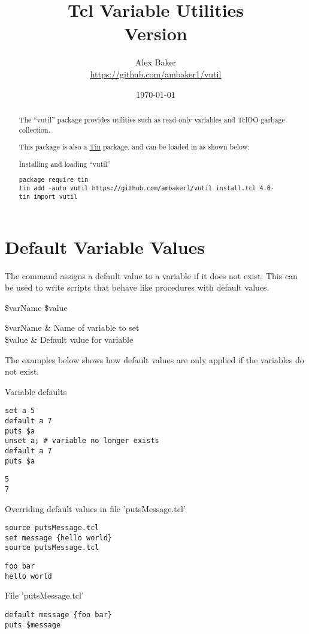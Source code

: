 \documentclass{article}
\title{\Huge Tcl Variable Utilities\\\small Version \version}
\author{Alex Baker\\\small\url{https://github.com/ambaker1/vutil}}
\date{\small\today}
\begin{document}
\maketitle
\begin{abstract}
\begin{center}
The ``vutil'' package provides utilities such as read-only variables and TclOO garbage collection.

This package is also a \textcolor{blue}{\href{https://github.com/ambaker1/Tin}{Tin}} package, and can be loaded in as shown below:
\end{center}
\begin{example}{Installing and loading ``vutil''}
\begin{lstlisting}
package require tin
tin add -auto vutil https://github.com/ambaker1/vutil install.tcl 4.0-
tin import vutil
\end{lstlisting}
\end{example}
\end{abstract}

\clearpage
\section{Default Variable Values}
The command  assigns a default value to a variable if it does not exist.
This can be used to write scripts that behave like procedures with default values.
\begin{syntax}
 \$varName \$value
\end{syntax}
\begin{args}
\$varName & Name of variable to set \\
\$value & Default value for variable
\end{args}

The examples below shows how default values are only applied if the variables do not exist.
\begin{example}{Variable defaults}
\begin{lstlisting}
set a 5
default a 7
puts $a
unset a; # variable no longer exists
default a 7
puts $a
\end{lstlisting}
\tcblower
\begin{lstlisting}
5
7
\end{lstlisting}
\end{example}
\begin{example}{Overriding default values in file 'putsMessage.tcl'}
\begin{lstlisting}
source putsMessage.tcl
set message {hello world}
source putsMessage.tcl
\end{lstlisting}
\tcblower
\begin{lstlisting}
foo bar
hello world
\end{lstlisting}
\end{example}
\begin{example}{File 'putsMessage.tcl'}
\begin{lstlisting}
default message {foo bar}
puts $message
\end{lstlisting}
\end{example}
\end{document}
